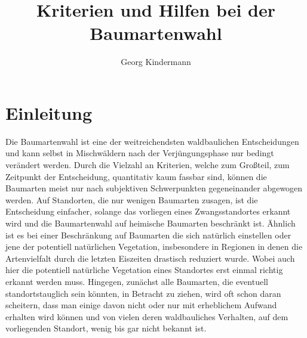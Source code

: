 \documentclass[twocolumn]{scrartcl}
\title{Kriterien und Hilfen bei der Baumartenwahl}
\author{Georg Kindermann}
\begin{document}

\tableofcontents

\section{Einleitung}

Die Baumartenwahl ist eine der weitreichendsten waldbaulichen
Entscheidungen und kann selbst in Mischwäldern nach der
Verjüngungsphase nur bedingt verändert werden. Durch die Vielzahl an
Kriterien, welche zum Großteil, zum Zeitpunkt der Entscheidung,
quantitativ kaum fassbar sind, können die Baumarten meist nur nach
subjektiven Schwerpunkten gegeneinander abgewogen werden. Auf
Standorten, die nur wenigen Baumarten zusagen, ist die Entscheidung
einfacher, solange das vorliegen eines Zwangsstandortes erkannt wird
und die Baumartenwahl auf heimische Baumarten beschränkt ist. Ähnlich
ist es bei einer Beschränkung auf Baumarten die sich natürlich
einstellen oder jene der potentiell natürlichen Vegetation,
insbesondere in Regionen in denen die Artenvielfalt durch die letzten
Eiszeiten drastisch reduziert wurde. Wobei auch hier die potentiell
natürliche Vegetation eines Standortes erst einmal richtig erkannt
werden muss. Hingegen, zunächst alle Baumarten, die eventuell
standortstauglich sein könnten, in Betracht zu ziehen, wird oft schon
daran scheitern, dass man einige davon nicht oder nur mit erheblichem
Aufwand erhalten wird können und von vielen deren waldbauliches
Verhalten, auf dem vorliegenden Standort, wenig bis gar nicht bekannt
ist.
\end{document}
